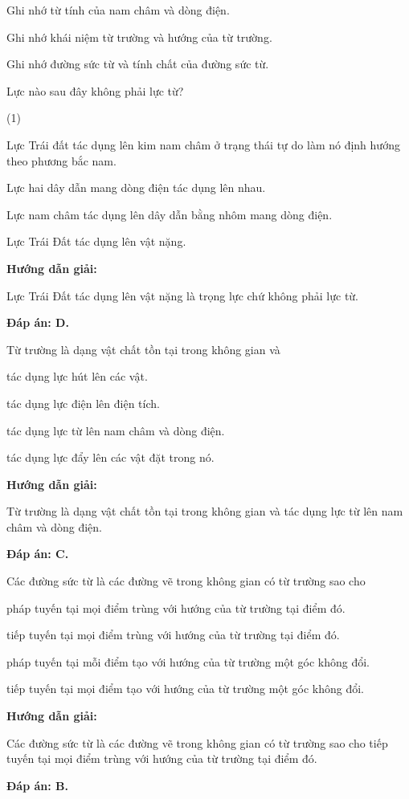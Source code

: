 Ghi nhớ từ tính của nam châm và dòng điện.

Ghi nhớ khái niệm từ trường và hướng của từ trường.

Ghi nhớ đường sức từ và tính chất của đường sức từ.

\vspace*{1em}
{Lực nào sau đây không phải lực từ?
\begin{mcq}(1)
	\item Lực Trái đất tác dụng lên kim nam châm ở trạng thái tự do làm nó định hướng theo phương bắc nam. 
	\item Lực hai dây dẫn mang dòng điện tác dụng lên nhau.
	\item Lực nam châm tác dụng lên dây dẫn bằng nhôm mang dòng điện.
	\item Lực Trái Đất tác dụng lên vật nặng.
\end{mcq}}
{\begin{center}
		\textbf{Hướng dẫn giải:}
\end{center}

Lực Trái Đất tác dụng lên vật nặng là trọng lực chứ không phải lực từ.	

\textbf{	Đáp án: D.}
}

{	
Từ trường là dạng vật chất tồn tại trong không gian và
	\begin{mcq}
		\item  tác dụng lực hút lên các vật.
		\item tác dụng lực điện lên điện tích.
		\item tác dụng lực từ lên nam châm và dòng điện.
		\item tác dụng lực đẩy lên các vật đặt trong nó.
	\end{mcq}
}{	
\begin{center}
		\textbf{Hướng dẫn giải:}
\end{center}
	
Từ trường là dạng vật chất tồn tại trong không gian và tác dụng lực từ lên nam châm và dòng điện.
	
\textbf{Đáp án: C.}
	
}

	{
	Các đường sức từ là các đường vẽ trong không gian có từ trường sao cho
	\begin{mcq}
		\item pháp tuyến tại mọi điểm trùng với hướng của từ trường tại điểm đó.
		\item tiếp tuyến tại mọi điểm trùng với hướng của từ trường tại điểm đó.
		\item pháp tuyến tại mỗi điểm tạo với hướng của từ trường một góc không đổi.
		\item tiếp tuyến tại mọi điểm tạo với hướng của từ trường một góc không đổi.
	\end{mcq}
}
{\begin{center}
		\textbf{Hướng dẫn giải:}
\end{center}
	
	Các đường sức từ là các đường vẽ trong không gian có từ trường sao cho tiếp tuyến tại mọi điểm trùng với hướng của từ trường tại điểm đó.
	
\textbf{	Đáp án: B.}
	
}

